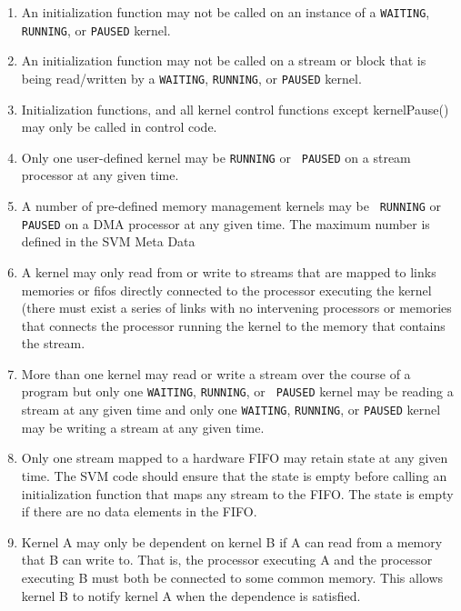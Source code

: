 \begin{enumerate}

\item An initialization function may not be called on an instance of a
{\tt WAITING}, {\tt RUNNING}, or {\tt PAUSED} kernel.

\item An initialization function may not be called on a stream or
block that is being read/written by a {\tt WAITING}, {\tt RUNNING}, or
{\tt PAUSED} kernel.

\item Initialization functions, and all kernel control functions
except kernelPause() may only be called in control code.

\item Only one user-defined kernel may be {\tt RUNNING} or {\tt
PAUSED} on a stream processor at any given time.

\item A number of pre-defined memory management kernels may be {\tt
RUNNING} or {\tt PAUSED} on a DMA processor at any given time.  The
maximum number is defined in the SVM Meta Data

\item A kernel may only read from or write to streams that are mapped
to links memories or fifos directly connected to the processor
executing the kernel (there must exist a series of links with no
intervening processors or memories that connects the processor running
the kernel to the memory that contains the stream.

\item More than one kernel may read or write a stream over the course
of a program but only one {\tt WAITING}, {\tt RUNNING}, or {\tt
PAUSED} kernel may be reading a stream at any given time and only one
{\tt WAITING}, {\tt RUNNING}, or {\tt PAUSED} kernel may be writing a
stream at any given time.

\item Only one stream mapped to a hardware FIFO may retain state at
any given time. The SVM code should ensure that the state is empty
before calling an initialization function that maps any stream to the
FIFO.  The state is empty if there are no data elements in the FIFO.

\item Kernel A may only be dependent on kernel B if A can read from a
memory that B can write to.  That is, the processor executing A and
the processor executing B must both be connected to some common
memory.  This allows kernel B to notify kernel A when the dependence
is satisfied.

\end{enumerate}

